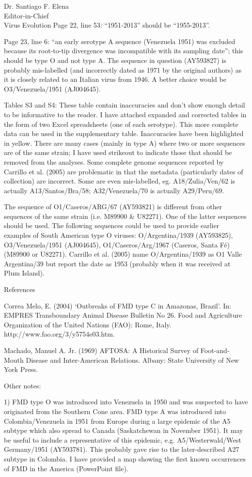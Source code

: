 \documentclass[12pt, a4paper]{letter} %
\begin{document}
\begin{letter}{
	Dr. Santiago F. Elena\\
    Editor-in-Chief \\
    Virus Evolution
}
Page 22, line 53: “1951-2013” should be “1955-2013”.

Page 23, line 6: “an early serotype A sequence (Venezuela 1951) was excluded because its root-to-tip divergence was incompatible with its sampling date”; this should be type O and not type A.
The sequence in question (AY593827) is probably mis-labelled (and incorrectly dated as 1971 by the original authors) as it is closely related to an Italian virus from 1946.
A better choice would be O3/Venezuela/1951 (AJ004645).

Tables S3 and S4: These table contain inaccuracies and don’t show enough detail to be informative to the reader. I have attached expanded and corrected tables in the form of two Excel spreadsheets (one of each serotype).
This more complete data can be used in the supplementary table.
Inaccuracies have been highlighted in yellow.
There are many cases (mainly in type A) where two or more sequences are of the same strain; I have used strikeout to indicate those that should be removed from the analyses.
Some complete genome sequences reported by Carrillo et al. (2005) are problematic in that the metadata (particularly dates of collection) are incorrect.
Some are even mis-labelled, eg. A18/Zulia/Ven/62 is actually A13/Santos/Bra/58; A32/Venezuela/70 is actually A29/Peru/69.

The sequence of O1/Caseros/ARG/67 (AY593821) is different from other sequences of the same strain (i.e. M89900 \& U82271). One of the latter sequences should be used.
The following sequences could be used to provide earlier examples of South American type O viruses: O/Argentina/1939 (AY593825), O3/Venezuela/1951 (AJ004645), O1/Caseros/Arg/1967 (Caseros, Santa Fé) (M89900 or U82271).
Carrillo et al. (2005) name O/Argentina/1939 as O1 Valle Argentina/39 but report the date as 1953 (probably when it was received at Plum Island).

References

Correa Melo, E. (2004) ‘Outbreaks of FMD type C in Amazonas, Brazil’. In: EMPRES Transboundary Animal Disease Bulletin No 26. Food and Agriculture Organization of the United Nations (FAO): Rome, Italy. http://www.fao.org/3/y5754e03.htm.

Machado, Manuel A. Jr. (1969) AFTOSA: A Historical Survey of Foot-and-Mouth Disease and Inter-American Relations. Albany: State University of New York Press.

Other notes:

1)      FMD type O was introduced into Venezuela in 1950 and was suspected to have originated from the Southern Cone area. FMD type A was introduced into Colombia/Venezuela in 1951 from Europe during a large epidemic of the A5 subtype which also spread to Canada (Saskatchewan in November 1951). It may be useful to include a representative of this epidemic, e.g. A5/Westerwald/West Germany/1951 (AY593781).
This probably gave rise to the later-described A27 subtype in Colombia.
I have provided a map showing the first known occurrences of FMD in the America (PowerPoint file).


\end{letter}
\end{document}
